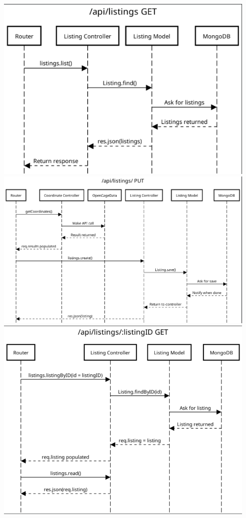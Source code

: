\documentclass[notitlepage]{article}
\begin{document}
	\begin{center}	
		\includegraphics[width=5in]{list.png}
		\includegraphics[width=5in]{create.png}
		\includegraphics[width=5in]{read.png}

\end{center}
\end{document}
